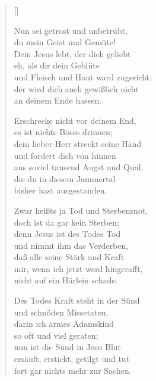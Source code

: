 \begin{multicols}{2}
\settowidth{\versewidth}{Zwar heißts ja Tod und Sterbensnot,}
\begin{verse}[\versewidth]

 Nun sei getrost und unbetrübt,\\
du mein Geist und Gemüte!\\
Dein Jesus lebt, der dich geliebt\\
eh, als dir dein Geblüte\\
und Fleisch und Haut ward zugericht;\\
der wird dich auch gewißlich nicht\\
an deinem Ende hassen.

 Erschrecke nicht vor deinem End,\\
es ist nichts Böses drinnen;\\
dein lieber Herr streckt seine Händ\\
und fordert dich von hinnen\\
aus soviel tausend Angst und Qual,\\
die du in diesem Jammertal\\
bisher hast ausgestanden.

 Zwar heißts ja Tod und Sterbensnot,\\
doch ist da gar kein Sterben;\\
denn Jesus ist des Todes Tod\\
und nimmt ihm das Verderben,\\
daß alle seine Stärk und Kraft\\
mir, wenn ich jetzt werd hingerafft,\\
nicht auf ein Härlein schade.

 Des Todes Kraft steht in der Sünd\\
und schnöden Missetaten,\\
darin ich armes Adamskind\\
so oft und viel geraten;\\
nun ist die Sünd in Jesu Blut\\
ersäuft, erstickt, getilgt und tut\\
fort gar nichts mehr zur Sachen.


\end{verse}
\end{multicols}
